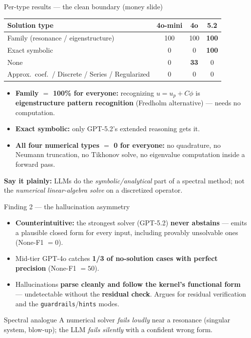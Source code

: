 \documentclass[10pt,aspectratio=169]{beamer}
\begin{document}
\begin{frame}{Per-type results --- the clean boundary (money slide)}
  \small
  \begin{center}
  \begin{tabular}{@{}lccc@{}}
    \toprule
    \textbf{Solution type} & \textbf{4o-mini} & \textbf{4o} & \textbf{5.2} \\
    \midrule
    Family (resonance / eigenstructure) & 100 & 100 & \textbf{100} \\
    Exact symbolic                      & 0   & 0   & \textbf{100} \\
    None                                & 0   & \textbf{33} & 0 \\
    Approx.\ coef.\ / Discrete / Series / Regularized & 0 & 0 & 0 \\
    \bottomrule
  \end{tabular}
  \end{center}
  \vspace{3pt}
  \begin{itemize}
    \item \textbf{Family $=$ 100\% for everyone:} recognizing $u=u_p+C\phi$ is \textbf{eigenstructure
          pattern recognition} (Fredholm alternative) --- needs no computation.
    \item \textbf{Exact symbolic:} only GPT-5.2's extended reasoning gets it.
    \item \textbf{All four numerical types $=$ 0 for everyone:} no quadrature, no Neumann truncation,
          no Tikhonov solve, no eigenvalue computation inside a forward pass.
  \end{itemize}
  \textbf{Say it plainly:} LLMs do the \emph{symbolic/analytical} part of a spectral method; not the
  \emph{numerical linear-algebra solve} on a discretized operator.
\end{frame}

\begin{frame}{Finding 2 --- the hallucination asymmetry}
  \begin{itemize}
    \item \textbf{Counterintuitive:} the strongest solver (GPT-5.2) \textbf{never abstains} ---
          emits a plausible closed form for every input, including provably unsolvable ones (None-F1 $=0$).
    \item Mid-tier GPT-4o catches \textbf{1/3 of no-solution cases with perfect precision} (None-F1 $=50$).
    \item Hallucinations \textbf{parse cleanly and follow the kernel's functional form} ---
          undetectable without the \textbf{residual check}. Argues for residual verification and the
          \texttt{guardrails}/\texttt{hints} modes.
  \end{itemize}
  \begin{block}{Spectral analogue}
    A numerical solver \emph{fails loudly} near a resonance (singular system, blow-up); the LLM
    \emph{fails silently} with a confident wrong form.
  \end{block}
\end{frame}
\end{document}
